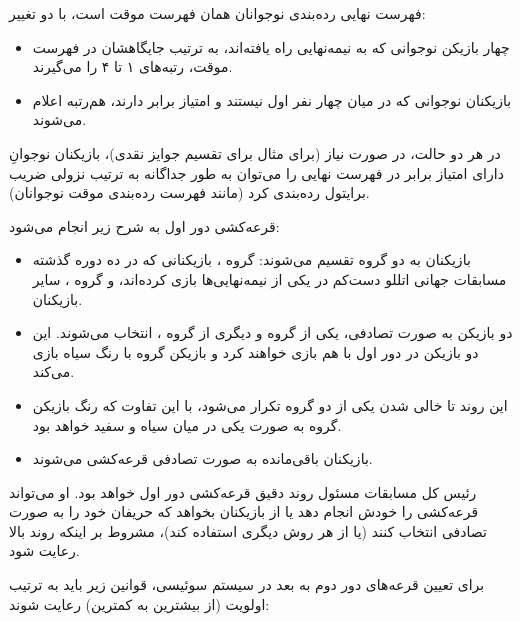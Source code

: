 فهرست نهایی رده‌بندی نوجوانان همان فهرست موقت است، با دو تغییر:

\begin{itemize}
  \item چهار بازیکن نوجوانی که به نیمه‌نهایی راه یافته‌اند، به ترتیب جایگاهشان در فهرست موقت، رتبه‌های ۱ تا ۴ را می‌گیرند.
  \item بازیکنان نوجوانی که در میان چهار نفر اول نیستند و امتیاز برابر دارند، هم‌رتبه اعلام می‌شوند.
\end{itemize}

در هر دو حالت، در صورت نیاز (برای مثال برای تقسیم جوایز نقدی)، بازیکنان نوجوانِ دارای امتیاز برابر در فهرست نهایی را می‌توان به طور جداگانه به ترتیب نزولی ضریب برایتول رده‌بندی کرد (مانند فهرست رده‌بندی موقت نوجوانان).



قرعه‌کشی دور اول به شرح زیر انجام می‌شود:

\begin{itemize}
  \item بازیکنان به دو گروه تقسیم می‌شوند: گروه ، بازیکنانی که در ده دوره گذشته مسابقات جهانی اتللو دست‌کم در یکی از نیمه‌نهایی‌ها بازی کرده‌اند، و گروه ، سایر بازیکنان.
  \item دو بازیکن به صورت تصادفی، یکی از گروه  و دیگری از گروه ، انتخاب می‌شوند. این دو بازیکن در دور اول با هم بازی خواهند کرد و بازیکن گروه  با رنگ سیاه بازی می‌کند.
  \item این روند تا خالی شدن یکی از دو گروه تکرار می‌شود، با این تفاوت که رنگ بازیکن گروه  به صورت یکی در میان سیاه و سفید خواهد بود.
  \item بازیکنان باقی‌مانده به صورت تصادفی قرعه‌کشی می‌شوند.
\end{itemize}

رئیس کل مسابقات مسئول روند دقیق قرعه‌کشی دور اول خواهد بود. او می‌تواند قرعه‌کشی را خودش انجام دهد یا از بازیکنان بخواهد که حریفان خود را به صورت تصادفی انتخاب کنند (یا از هر روش دیگری استفاده کند)، مشروط بر اینکه روند بالا رعایت شود.


برای تعیین قرعه‌های دور دوم به بعد در سیستم سوئیسی، قوانین زیر باید به ترتیب اولویت (از بیشترین به کمترین) رعایت شوند:

